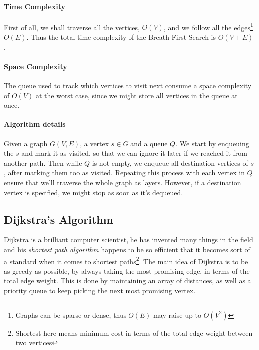 \documentclass[12pt]{article}
\begin{document}


\paragraph{Time Complexity} First of all, we shall traverse all the vertices, $O(V)$, and we follow all the edges\footnote{Graphs can be sparse or dense, thus $O(E)$ may raise up to $O(V^2)$} $O(E)$. Thus the total time complexity of the Breath First Search is $O(V+E)$.

\paragraph{Space Complexity} The queue used to track which vertices to visit next consume a space complexity of $O(V)$ at the worst case, since we might store all vertices in the queue at once.


\paragraph{Algorithm details} Given a graph $G(V,E)$, a vertex $s \in G$ and a queue $Q$. We start by enqueuing the $s$ and mark it as visited, so that we can ignore it later if we reached it from another path. Then while $Q$ is not empty, we enqueue all destination vertices of $s$, after marking them too as visited. Repeating this process with each vertex in $Q$ ensure that we'll traverse the whole graph as layers. However, if a destination vertex is specified, we might stop as soon as it's dequeued.

\subsection{Dijkstra's Algorithm}

Dijkstra is a brilliant computer scientist, he has invented many things in the field and his \textit{shortest path algorithm} happens to be so efficient that it becomes sort of a standard when it comes to shortest paths\footnote{Shortest here means minimum cost in terms of the total edge weight between two vertices}. The main idea of Dijkstra is to be as greedy as possible, by always taking the most promising edge, in terms of the total edge weight. This is done by maintaining an array of distances, as well as a priority queue to keep picking the next most promising vertex.
\end{document}

